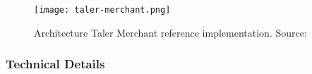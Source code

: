 

\begin{figure}[h!]
    \centering
    \texttt{[image: taler-merchant.png]}
    \caption{Architecture Taler Merchant reference implementation. Source: \cite{dold:the-gnu-taler-system}}
    \label{fig:taler-arch-merchant}
\end{figure}

\subsubsection{Technical Details}

